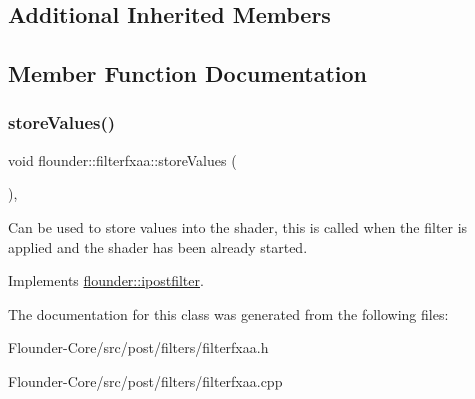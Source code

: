 \subsection*{Additional Inherited Members}


\subsection{Member Function Documentation}
\mbox{\label{classflounder_1_1filterfxaa_abee255cfd538d96881386157e6e8eea0}} 
\subsubsection{\texorpdfstring{store\+Values()}{storeValues()}}
{\footnotesize\ttfamily void flounder\+::filterfxaa\+::store\+Values (\begin{DoxyParamCaption}{ }\end{DoxyParamCaption})\hspace{0.3cm}{\ttfamily [override]}, {\ttfamily [virtual]}}



Can be used to store values into the shader, this is called when the filter is applied and the shader has been already started. 



Implements \hyperlink{classflounder_1_1ipostfilter_a9b658b4672718d5ac36539875bde722e}{flounder\+::ipostfilter}.



The documentation for this class was generated from the following files\+:\begin{DoxyCompactItemize}
\item 
Flounder-\/\+Core/src/post/filters/filterfxaa.\+h\item 
Flounder-\/\+Core/src/post/filters/filterfxaa.\+cpp\end{DoxyCompactItemize}
